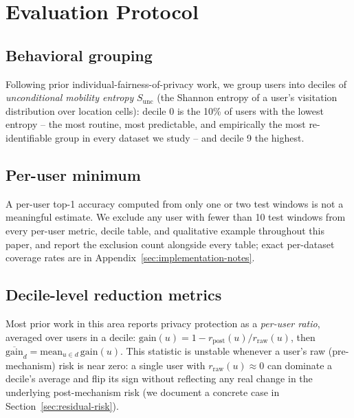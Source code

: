 \section{Evaluation Protocol}
\label{sec:evaluation-protocol}

\subsection{Behavioral grouping}
Following prior individual-fairness-of-privacy work, we group users
into deciles of \emph{unconditional mobility entropy} $S_{\mathrm{unc}}$
(the Shannon entropy of a user's visitation distribution over
location cells): decile 0 is the 10\% of users with the lowest
entropy -- the most routine, most predictable, and empirically the
most re-identifiable group in every dataset we study -- and decile 9
the highest.

\subsection{Per-user minimum}
A per-user top-1 accuracy computed from only one or two test windows is
not a meaningful estimate. We exclude any user with fewer than 10 test
windows from every per-user metric, decile table, and qualitative
example throughout this paper, and report the exclusion count
alongside every table; exact per-dataset coverage rates are in
Appendix~\ref{sec:implementation-notes}.

\subsection{Decile-level reduction metrics}
\label{sec:decile-reduction-metrics}
Most prior work in this area reports privacy protection as a
\emph{per-user ratio}, averaged over users in a decile:
$\mathrm{gain}(u) = 1 - r_{\mathrm{post}}(u) / r_{\mathrm{raw}}(u)$,
then $\overline{\mathrm{gain}}_d = \mathrm{mean}_{u \in d}\,
\mathrm{gain}(u)$. This statistic is unstable whenever a user's raw
(pre-mechanism) risk is near zero: a single user with
$r_{\mathrm{raw}}(u) \approx 0$ can dominate a decile's average and
flip its sign without reflecting any real change in the underlying
post-mechanism risk (we document a concrete case in
Section~\ref{sec:residual-risk}).

